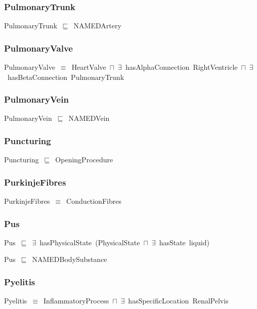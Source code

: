 \documentclass{article}
\begin{document}
\subsubsection*{PulmonaryTrunk}

PulmonaryTrunk~\ensuremath{\sqsubseteq}~NAMEDArtery~

\subsubsection*{PulmonaryValve}

PulmonaryValve~\ensuremath{\equiv}~HeartValve~\ensuremath{\sqcap}~\ensuremath{\exists}~hasAlphaConnection~RightVentricle~\ensuremath{\sqcap}~\ensuremath{\exists}~hasBetaConnection~PulmonaryTrunk

\subsubsection*{PulmonaryVein}

PulmonaryVein~\ensuremath{\sqsubseteq}~NAMEDVein~

\subsubsection*{Puncturing}

Puncturing~\ensuremath{\sqsubseteq}~OpeningProcedure~

\subsubsection*{PurkinjeFibres}

PurkinjeFibres~\ensuremath{\equiv}~ConductionFibres

\subsubsection*{Pus}

Pus~\ensuremath{\sqsubseteq}~\ensuremath{\exists}~hasPhysicalState~(PhysicalState~\ensuremath{\sqcap}~\ensuremath{\exists}~hasState~liquid)~

Pus~\ensuremath{\sqsubseteq}~NAMEDBodySubstance~

\subsubsection*{Pyelitis}

Pyelitis~\ensuremath{\equiv}~InflammatoryProcess~\ensuremath{\sqcap}~\ensuremath{\exists}~hasSpecificLocation~RenalPelvis
\end{document}
